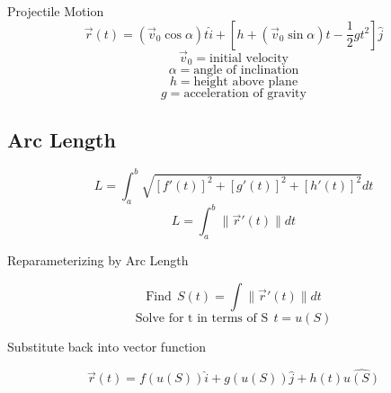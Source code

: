\documentclass[12pt]{article}
\numberwithin{equation}{subsection}
\newcommand{\magp}[1]{\| #1 \|}
\begin{document}
\begin{flushleft}
Projectile Motion
\begin{equation}
\vec{r}(t)= (\vec{v}_{0}\cos{\alpha})t\hat{i}+[h+(\vec{v}_{0}\sin{\alpha})t-\frac{1}{2}gt^{2}]\hat{j}
\end{equation}
$$ \vec{v}_{0}= \textrm{initial velocity}$$
$$ \alpha= \textrm{angle of inclination}$$
$$ h = \textrm{height above plane}$$
$$ g = \textrm{acceleration of gravity}$$




\subsection{Arc Length}
\begin{equation}
L= \int_{a}^{b}\sqrt{[f'(t)]^{2}+[g'(t)]^{2}+[h'(t)]^{2}} dt
\end{equation}
\begin{equation}
L= \int_{a}^{b}\magp{\vec{r}'(t)} dt
\end{equation}

Reparameterizing by Arc Length
\end{flushleft}
\begin{equation}
\textrm{Find} \ \  S(t)=\int \magp{\vec{r}'(t)} dt
\end{equation}
\begin{equation}
\textrm{Solve for t in terms of S} \ \ t=u(S)
\end{equation}
\begin{center}
Substitute back into vector function
\end{center}
\begin{equation}
\vec{r}(t)= f(u(S))\hat{i}+g(u(S))\hat{j}+h(t)\hat{u(S)}
\end{equation}
\newpage
\end{document}
